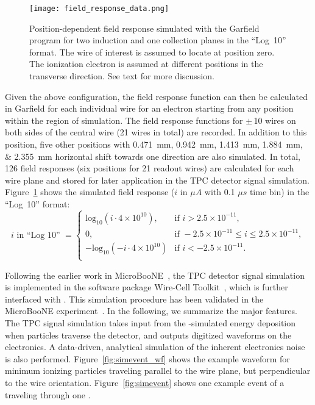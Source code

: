  \begin{figure}[!htp]
  \centering
  \texttt{[image: field\_response\_data.png]}
\caption[Position-dependent field response simulated with the Garfield program]{Position-dependent field response simulated with the Garfield program 
for two induction and one collection planes in the ``Log~10'' format. The wire of interest 
is assumed to locate at position zero. The ionization electron is assumed at different
positions in the transverse direction. See text for more discussion.}
\label{field_resp}
\end{figure}

 Given the above configuration, the field response function can then be calculated in Garfield
  for each individual wire  for an
  electron starting from any position within the region of simulation. 
  The field response functions for $\pm\,$10 wires on both sides of the central wire (21 wires in total) are 
  recorded. In addition to this position, five other positions with
  \SIlist{0.471;0.942;1.413;1.884;2.355}{\mm} horizontal shift towards one direction are also simulated.
  In total, 126 field responses (six positions for 21 readout wires) are calculated for each wire plane and stored for later
  application in the TPC detector signal simulation.
  Figure~\ref{field_resp} shows the simulated field response ($i$ in $\mu A$ with 0.1 $\mu s$ time bin) 
   in the ``Log~10'' format:
   \begin{equation}\label{eq:log10}
    i \text{ in ``Log 10'' } =
    \begin{cases}
      \text{log}_{10}(i\cdot4\times10^{10}),& \text{if }i>2.5\times10^{-11},\\
      0,& \text{if }  -2.5 \times10^{-11} \leq i \leq 2.5 \times 10^{-11},\\
      -\text{log}_{10}(- i\cdot4\times10^{10})& \text{if }i<-2.5\times10^{-11}.\\
      \end{cases}
  \end{equation}
  
  Following the earlier work in MicroBooNE~\cite{Adams:2018dra}, the TPC detector signal simulation
  is implemented in the software package Wire-Cell Toolkit~\cite{ref:wire_cell_toolkit,ref:full_simulation}, which is 
  further interfaced with . This simulation procedure has been validated in the MicroBooNE experiment~\cite{Adams:2018gbi}. In
  the following, we summarize the major features. The TPC signal simulation takes input from the -simulated energy deposition when particles traverse the detector, and outputs digitized waveforms on the  electronics.
   A data-driven, analytical simulation of the inherent electronics noise is also performed. 
Figure~\ref{fig:simevent_wf} shows the example waveform for minimum ionizing particles traveling parallel to 
the wire plane, but perpendicular to the wire orientation.  Figure~\ref{fig:simevent} shows one example event of 
a  traveling through one . 

